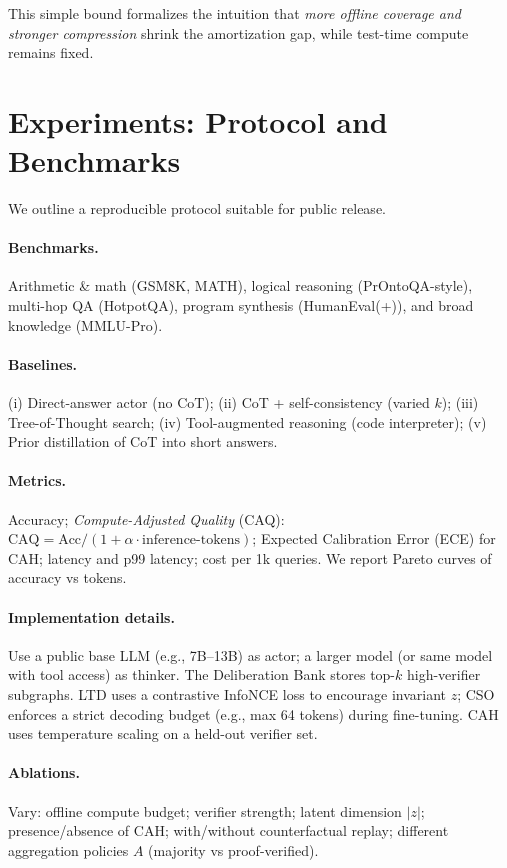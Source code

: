 \documentclass[11pt]{article}
\newcommand{\1}{\mathbf{1}}
\begin{document}
This simple bound formalizes the intuition that \emph{more offline coverage and stronger compression} shrink the amortization gap, while test-time compute remains fixed.

\section{Experiments: Protocol and Benchmarks}

We outline a reproducible protocol suitable for public release.

\paragraph{Benchmarks.} Arithmetic \& math (GSM8K, MATH), logical reasoning (PrOntoQA-style), multi-hop QA (HotpotQA), program synthesis (HumanEval(+)), and broad knowledge (MMLU-Pro).

\paragraph{Baselines.} (i) Direct-answer actor (no CoT); (ii) CoT + self-consistency (varied $k$); (iii) Tree-of-Thought search; (iv) Tool-augmented reasoning (code interpreter); (v) Prior distillation of CoT into short answers.

\paragraph{Metrics.} Accuracy; \emph{Compute-Adjusted Quality} (CAQ): $\text{CAQ} = \text{Acc} / (1 + \alpha \cdot \text{inference-tokens})$; Expected Calibration Error (ECE) for CAH; latency and p99 latency; cost per 1k queries. We report Pareto curves of accuracy vs tokens.

\paragraph{Implementation details.} Use a public base LLM (e.g., 7B--13B) as actor; a larger model (or same model with tool access) as thinker. The Deliberation Bank stores top-$k$ high-verifier subgraphs. LTD uses a contrastive InfoNCE loss to encourage invariant $z$; CSO enforces a strict decoding budget (e.g., max 64 tokens) during fine-tuning. CAH uses temperature scaling on a held-out verifier set.

\paragraph{Ablations.} Vary: offline compute budget; verifier strength; latent dimension $|z|$; presence/absence of CAH; with/without counterfactual replay; different aggregation policies $A$ (majority vs proof-verified).
\end{document}
